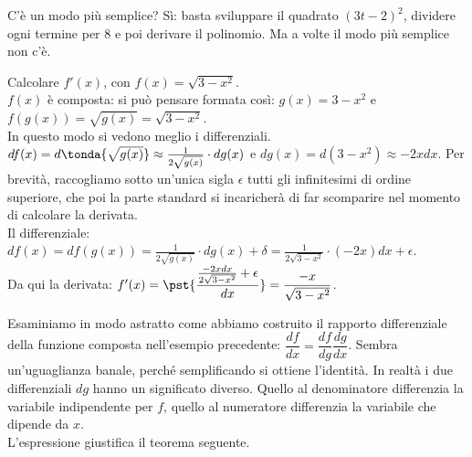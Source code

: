 C'è un modo più semplice? Sì: basta sviluppare il quadrato $(3t-2)^2$, dividere
ogni termine per $8$ e poi derivare il polinomio. Ma a volte il modo più semplice 
non c'è.
\begin{esempio}
  Calcolare $f'(x)$, con $f(x)=\sqrt{3-x^2}$.\\
  $f(x)$ è composta: si può pensare
  formata così: $g(x)=3-x^2$ e $f(g(x))=\sqrt{g(x)}=\sqrt{3-x^2}$.\\
  In questo modo si vedono meglio i differenziali.
  $df(x)=d\tonda{\sqrt{g(x)}}\approx\frac{1}{2\sqrt{g(x)}}\cdot dg(x)$ e 
  $dg(x)=d(3-x^2)\approx-2xdx$. Per brevità, raccogliamo sotto un'unica
  sigla $\epsilon$ tutti gli infinitesimi 
  di ordine superiore, che poi la parte standard si incaricherà di far 
  scomparire nel momento di calcolare la derivata.\\
  Il differenziale: $df(x)=df(g(x))=\frac{1}{2\sqrt{g(x)}}\cdot dg(x)+\delta=
  \frac{1}{2\sqrt{3-x^2}}\cdot (-2x)dx+ \epsilon$.\\
  Da qui la derivata: 
  $f'(x)=\pst{\dfrac{\frac{-2xdx}{2\sqrt{3-x^2}} +\epsilon}{dx}}=
  \dfrac{-x}{\sqrt{3-x^2}}$.
\end{esempio}
Esaminiamo in modo astratto come abbiamo costruito il rapporto 
differenziale della funzione composta nell'esempio precedente: 
$\dfrac{df}{dx}=\dfrac{df}{dg}\dfrac{dg}{dx}$. 
Sembra un'uguaglianza banale, perché semplificando si ottiene
l'identità. In realtà i due differenziali $dg$ hanno un significato
diverso. Quello al denominatore differenzia la variabile indipendente per 
$f$, quello al numeratore differenzia la variabile che dipende da $x$.\\
L'espressione giustifica il teorema seguente.

